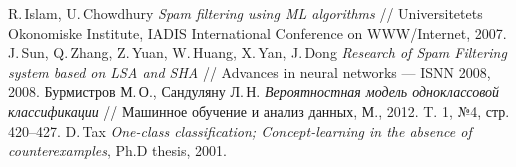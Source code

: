 \documentclass[12pt,a4paper,oneside]{article}
\begin{document}
\begin{thebibliography}{99}
	R.\,Islam, U.\,Chowdhury \textit{Spam filtering using ML algorithms} // Universitetets Okonomiske Institute, IADIS International Conference on WWW/Internet, 2007.
	J.\,Sun, Q.\,Zhang, Z.\,Yuan, W.\,Huang, X.\,Yan, J.\,Dong \textit{Research of Spam Filtering system based on LSA and SHA} // Advances in neural networks --- ISNN 2008, 2008.
	Бурмистров М.\,О., Сандуляну Л.\,Н. \textit{Вероятностная модель одноклассовой классификации} // Машинное обучение и анализ данных, М., 2012. T. 1, №4, стр. 420--427.
	D.\,Tax \textit{One-class classification; Concept-learning in the absence of counterexamples}, Ph.D thesis, 2001.
\end{thebibliography}
\end{document}
